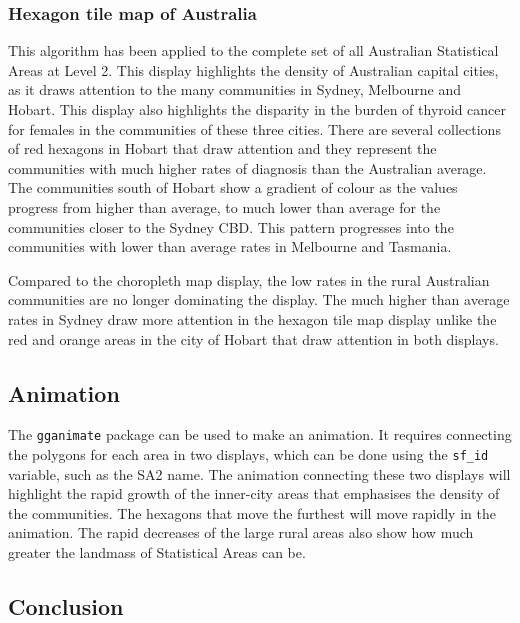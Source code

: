 \hypertarget{hexagon-tile-map-of-australia}{%
\subsubsection{Hexagon tile map of
Australia}\label{hexagon-tile-map-of-australia}}

This algorithm has been applied to the complete set of all Australian
Statistical Areas at Level 2. This display highlights the density of
Australian capital cities, as it draws attention to the many communities
in Sydney, Melbourne and Hobart. This display also highlights the
disparity in the burden of thyroid cancer for females in the communities
of these three cities. There are several collections of red hexagons in
Hobart that draw attention and they represent the communities with much
higher rates of diagnosis than the Australian average. The communities
south of Hobart show a gradient of colour as the values progress from
higher than average, to much lower than average for the communities
closer to the Sydney CBD. This pattern progresses into the communities
with lower than average rates in Melbourne and Tasmania.

Compared to the choropleth map display, the low rates in the rural
Australian communities are no longer dominating the display. The much
higher than average rates in Sydney draw more attention in the hexagon
tile map display unlike the red and orange areas in the city of Hobart
that draw attention in both displays.

\hypertarget{animation}{%
\subsection{Animation}\label{animation}}

The \texttt{gganimate} \citep{gganimate} package can be used to make an
animation. It requires connecting the polygons for each area in two
displays, which can be done using the \texttt{sf\_id} variable, such as
the SA2 name. The animation connecting these two displays will highlight
the rapid growth of the inner-city areas that emphasises the density of
the communities. The hexagons that move the furthest will move rapidly
in the animation. The rapid decreases of the large rural areas also show
how much greater the landmass of Statistical Areas can be.

\hypertarget{conclusion-03}{%
\subsection{Conclusion}\label{conclusion-03}}

